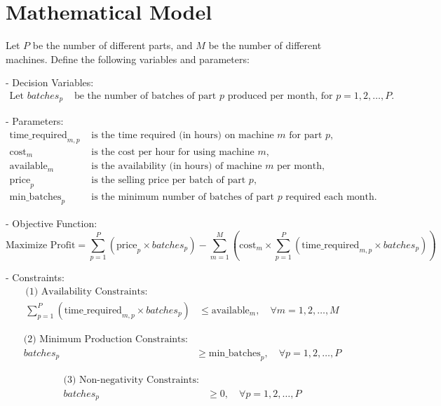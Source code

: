 \documentclass{article}
\begin{document}
\section*{Mathematical Model}

Let \( P \) be the number of different parts, and \( M \) be the number of different machines. Define the following variables and parameters:

- Decision Variables:
  \[
  \begin{align*}
  \text{Let } batches_p & \text{ be the number of batches of part } p \text{ produced per month, for } p = 1, 2, \ldots, P.
  \end{align*}
  \]

- Parameters:
  \[
  \begin{align*}
  \text{time\_required}_{m,p} & \text{ is the time required (in hours) on machine } m \text{ for part } p, \\
  \text{cost}_{m} & \text{ is the cost per hour for using machine } m, \\
  \text{available}_{m} & \text{ is the availability (in hours) of machine } m \text{ per month}, \\
  \text{price}_{p} & \text{ is the selling price per batch of part } p, \\
  \text{min\_batches}_{p} & \text{ is the minimum number of batches of part } p \text{ required each month.}
  \end{align*}
  \]

- Objective Function:
  \[
  \text{Maximize } \text{Profit} = \sum_{p=1}^{P} (\text{price}_p \times batches_p) - \sum_{m=1}^{M} \left(\text{cost}_m \times \sum_{p=1}^{P} (\text{time\_required}_{m,p} \times batches_p)\right)
  \]

- Constraints:
  \[
  \begin{align*}
  \text{(1) Availability Constraints:} \\
  \sum_{p=1}^{P} (\text{time\_required}_{m,p} \times batches_p) & \leq \text{available}_m, \quad \forall m = 1, 2, \ldots, M
  \end{align*}
  \]
  
  \[
  \begin{align*}
  \text{(2) Minimum Production Constraints:} \\
  batches_p & \geq \text{min\_batches}_p, \quad \forall p = 1, 2, \ldots, P
  \end{align*}
  \]

  \[
  \begin{align*}
  \text{(3) Non-negativity Constraints:} \\
  batches_p & \geq 0, \quad \forall p = 1, 2, \ldots, P
  \end{align*}
  \]
\end{document}
